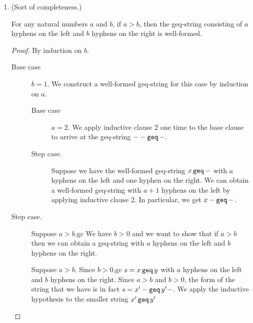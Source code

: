 \documentclass[11pt,letterpaper]{article}
\begin{document}
\begin{enumerate}
    \item (Sort of completeness.)

        \begin{prop}
            For any natural numbers $a$ and $b$, if $a > b$, then the
            geq-string consisting of $a$ hyphens on the left and $b$ hyphens on
            the right is well-formed.
        \end{prop}

        \begin{proof}
            By induction on $b$.

            \begin{description}
                \item[Base case] $b = 1$.
                    We construct a well-formed geq-string for this case by
                    induction on $a$.

                    \begin{description}
                        \item[Base case] $a = 2$.
                            We apply inductive clause 2 one time to the base
                            clause to arrive at the geq-string $-- \operatorname{\mathtt{geq}} -$.

                        \item[Step case.]
                            Suppose we have the well-formed geq-string
                            $x \operatorname{\mathtt{geq}} -$ with $a$ hyphens on the left and one
                            hyphen on the right.
                            We can obtain a well-formed geq-string with $a+1$
                            hyphens on the left by applying inductive clause 2.
                            In particular, we get $x- \operatorname{\mathtt{geq}} -$.
                    \end{description}

                \item[Step case.]
                    Suppose $a > b$.gc
                    We have $b > 0$ and we want to show that if $a > b$ then we
                    can obtain a geq-string with $a$ hyphens on the left and
                    $b$ hyphens on the right.

                    Suppose $a > b$. Since $b > 0$,gc
                    $s = x \operatorname{\mathtt{geq}} y$
                    with $a$ hyphens on the left and $b$ hyphens on the right.
                    Since $a > b$ and $b > 0$, the form of the string that we
                    have is in fact $s = x^\prime - \operatorname{\mathtt{geq}} y^\prime -$.
                    We apply the inductive hypothesis to the smaller string
                    $x^\prime \operatorname{\mathtt{geq}} y^\prime$
            \end{description}
        \end{proof}
\end{enumerate}
\end{document}
